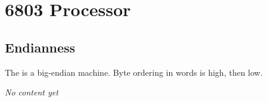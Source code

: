 \chapter{6803 Processor}
\label{processor:6803}

\section{Endianness}

The  is a big-endian machine. Byte ordering in words is high, then low.

\emph{No content yet}
